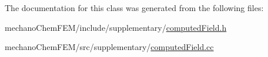 The documentation for this class was generated from the following files\-:\begin{DoxyCompactItemize}
\item 
mechano\-Chem\-F\-E\-M/include/supplementary/\hyperlink{computed_field_8h}{computed\-Field.\-h}\item 
mechano\-Chem\-F\-E\-M/src/supplementary/\hyperlink{computed_field_8cc}{computed\-Field.\-cc}\end{DoxyCompactItemize}
